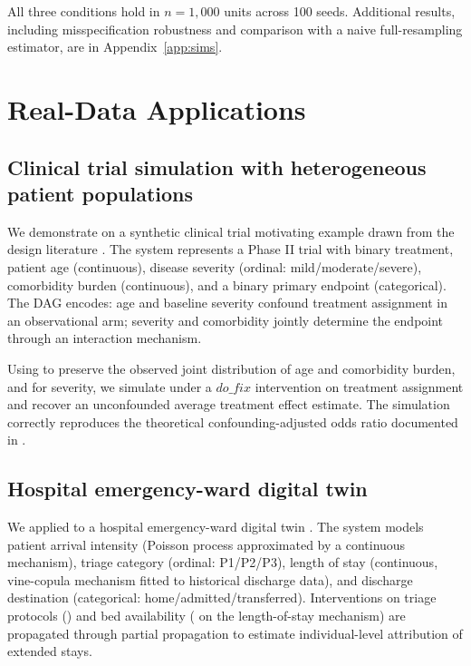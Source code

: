 \documentclass[article]{jss}
\begin{document}
All three conditions hold in $n = 1{,}000$ units across 100 seeds. Additional results, including misspecification robustness and comparison with a naive full-resampling estimator, are in Appendix~\ref{app:sims}.

\section{Real-Data Applications}
\label{sec:applications}

\subsection{Clinical trial simulation with heterogeneous patient populations}

We demonstrate  on a synthetic clinical trial motivating example drawn from the design literature \citep{morris2019using}. The system represents a Phase II trial with binary treatment, patient age (continuous), disease severity (ordinal: mild/moderate/severe), comorbidity burden (continuous), and a binary primary endpoint (categorical). The DAG encodes: age and baseline severity confound treatment assignment in an observational arm; severity and comorbidity jointly determine the endpoint through an interaction mechanism.

Using  to preserve the observed joint distribution of age and comorbidity burden, and  for severity, we simulate under a $do\_fix$ intervention on treatment assignment and recover an unconfounded average treatment effect estimate. The simulation correctly reproduces the theoretical confounding-adjusted odds ratio documented in \citet{morris2019using}.

\subsection{Hospital emergency-ward digital twin}

We applied  to a hospital emergency-ward digital twin \citep{sargent2010verification}. The system models patient arrival intensity (Poisson process approximated by a continuous mechanism), triage category (ordinal: P1/P2/P3), length of stay (continuous, vine-copula mechanism fitted to historical discharge data), and discharge destination (categorical: home/admitted/transferred). Interventions on triage protocols () and bed availability ( on the length-of-stay mechanism) are propagated through partial propagation to estimate individual-level attribution of extended stays.
\end{document}
